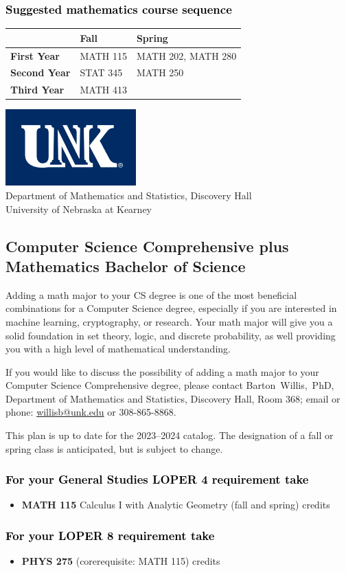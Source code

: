 \documentclass[10pt]{article}
\makeatletter
\newcommand{\calcone}{\textbf{MATH 115} Calculus I with Analytic Geometry (fall and spring) \dotfill 5 credits}
\newcommand{\calconeshort}{MATH 115}
\newcommand{\calctwoshort}{MATH 202}
\newcommand{\foundationsshort}{MATH 250}
\newcommand{\linearshort}{MATH 280}
\newcommand{\discreteshort}{MATH 413}
\newcommand{\appliedstatshort}{STAT 345}
\newcommand{\physics}{\textbf{PHYS 275}  (corerequisite: \calconeshort) \dotfill 3 credits}
\newcommand{\contactbw}{\mbox{Barton Willis, PhD}, Department of Mathematics and Statistics,  Discovery Hall, Room 368;
email or phone: \href{mailto:willisb@unk.edu}{willisb@unk.edu} or 308-865-8868.}
\newcommand{\forinfo}[2]{If you would like to discuss the possibility of adding a math {#1} to your {#2}, please contact \contactbw}
\newcommand{\catalog}{2023--2024 }
\newcommand{\LOPER}{LOPER\xspace}
\newcommand{\uptodate}{This plan is up to date for  the \catalog catalog. The designation of a fall or spring class is 
anticipated, but  is subject to change.}
\newcommand{\myheading}{
\begin{flushleft}
\includegraphics[scale=0.35]{unk-logo}\\
\setcounter{footnote}{0}
\vspace{0.25in}
 \textcolor{unkblue}{Department of Mathematics and Statistics, Discovery Hall} \\
  \textcolor{unkblue}{University of Nebraska at Kearney}
\end{flushleft}}
\newcommand{\mathminor}{
  \begin{center}
   \begin{tabular}[h]{| l | l | l|} 
      \hline
      & \textbf{Fall}         &  \textbf{Spring}  \\ \hline 
      \textbf{First Year} & \calconeshort & \calctwoshort, \linearshort \\  \hline
      \textbf{Second Year} &  \appliedstatshort{} &  \foundationsshort \\ \hline
      \textbf{Third Year} &    \discreteshort              &  \\ \hline
      \end{tabular}
      \end{center}}
\makeatother
\begin{document}
\vspace{-0.1in}
\subsubsection*{\textcolor{black}{Suggested mathematics course sequence}}

\begin{center}
\mathminor
\end{center}


 


\newpage

\myheading



\vspace{-0.1in}
\subsection*{\textbf{\textcolor{unkblue}{Computer Science Comprehensive plus Mathematics Bachelor of Science}}}

Adding a math major to your CS degree is one of the most beneficial combinations for 
a Computer Science degree, especially if you are interested in machine learning, 
cryptography,   or research.  Your math major  will give you a solid foundation 
in set theory, logic, and discrete probability, 
as well providing you with a high level of mathematical understanding. 



\forinfo{major}{Computer Science Comprehensive degree}

\uptodate

\subsubsection*{\textcolor{black}{For your General Studies \LOPER 4 requirement take}}
\begin{itemize}
\item \calcone
\end{itemize}

\subsubsection*{\textcolor{black}{For your \LOPER 8 requirement take}}

\begin{itemize}
   \item \physics 
\end{itemize}
\end{document}
